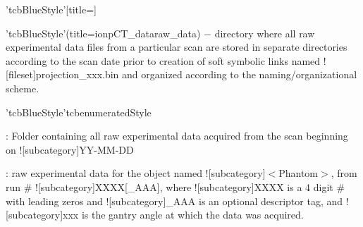 \par\bigskip\smallskip%
\begin{tcbenvironment}'tcbBlueStyle'[title=]
\begin{tcbparagraph}'tcbBlueStyle'(title=\dirsep ion\dirsep pCT\_data\dirsep raw\_data)%
$\boldsymbol{-}$ directory where all raw experimental data files from a particular scan are stored in separate directories according to the scan date prior to creation of soft symbolic links named \docentry![fileset]{projection\_xxx.bin} and organized according to the naming/organizational scheme.
\end{tcbparagraph}
\begin{tcbparagraph}'tcbBlueStyle'{tcbenumeratedStyle}
\begin{ThinEnum}[labelindent=1pt, leftmargin=*]
    \item {} : Folder containing all raw experimental data acquired from the scan beginning on \docentry![subcategory]{YY-MM-DD}
    \begin{ThinEnum}[labelindent=1pt, leftmargin=*]
        \item {} : raw experimental data for the object named \docentry![subcategory]{$<$Phantom$>$}, from run \# \docentry![subcategory]{XXXX[\_AAA]}, where \docentry![subcategory]{XXXX} is a 4 digit \# with leading zeros and \docentry![subcategory]{\_AAA} is an optional descriptor tag, and \docentry![subcategory]{xxx} is the gantry angle at which the data was acquired.
    \end{ThinEnum}
\end{ThinEnum}
\end{tcbparagraph}
\end{tcbenvironment}
\endinput
